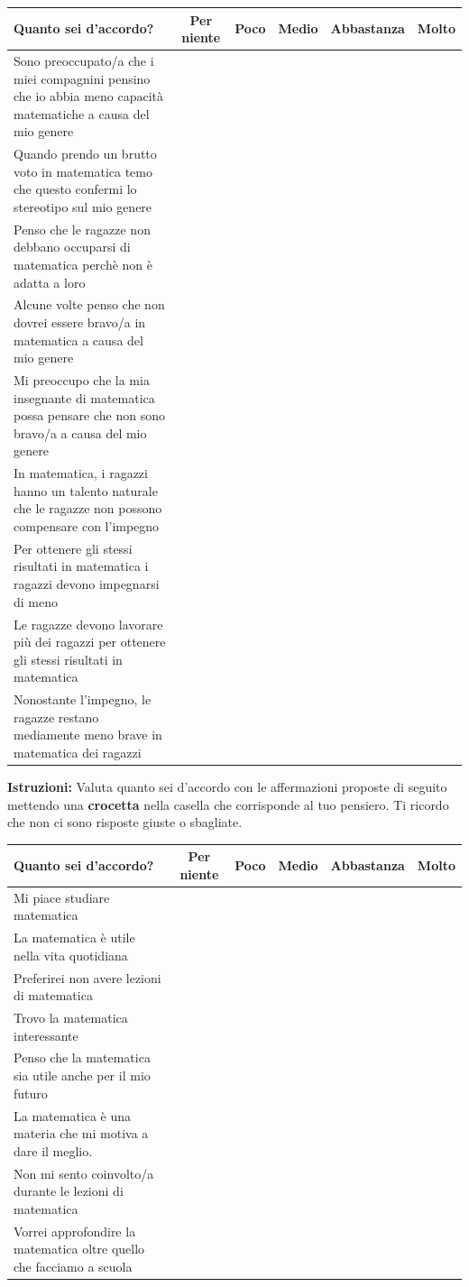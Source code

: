 \documentclass[11pt]{article}
\begin{document}
\noindent\begin{tabular}{|p{7cm}|c|c|c|c|c|}
  \hline
  \textbf{Quanto sei d'accordo?} & \textbf{Per niente} & \textbf{Poco} & \textbf{Medio} & \textbf{Abbastanza} & \textbf{Molto} \\
  \hline
  Sono preoccupato/a che i miei compagnini pensino che io abbia meno capacità matematiche a causa del mio genere & & & & & \\
  \hline
  Quando prendo un brutto voto in matematica temo che questo confermi lo stereotipo sul mio genere & & & & & \\
  \hline
  Penso che le ragazze non debbano occuparsi di matematica perchè non è adatta a loro & & & & & \\
  \hline
  Alcune volte penso che non dovrei essere bravo/a in matematica a causa del mio genere & & & & & \\
  \hline
  Mi preoccupo che la mia insegnante di matematica possa pensare che non sono bravo/a a causa del mio genere & & & & & \\
  \hline
  In matematica, i ragazzi hanno un talento naturale che le ragazze non possono compensare con l’impegno & & & & & \\
  \hline 
  Per ottenere gli stessi risultati in matematica i ragazzi devono impegnarsi di meno & & & & & \\
  \hline
  Le ragazze devono lavorare più dei ragazzi per ottenere gli stessi risultati in matematica & & & & & \\
  \hline
  Nonostante l’impegno, le ragazze restano mediamente meno brave in matematica dei ragazzi & & & & & \\
  \hline
\end{tabular}
\newpage
\noindent\textbf{Istruzioni:} Valuta quanto sei d'accordo con le affermazioni proposte di seguito mettendo una \textbf{crocetta} nella casella che corrisponde al tuo pensiero. Ti ricordo che non ci sono risposte giuste o sbagliate. 
\newline

\noindent\begin{tabular}{|p{7cm}|c|c|c|c|c|}
  \hline
  \textbf{Quanto sei d'accordo?} & \textbf{Per niente} & \textbf{Poco} & \textbf{Medio} & \textbf{Abbastanza} & \textbf{Molto} \\
  \hline
  Mi piace studiare matematica & & & & & \\
  \hline
  La matematica è utile nella vita quotidiana & & & & & \\
  \hline
  Preferirei non avere lezioni di matematica & & & & & \\
  \hline
  Trovo la matematica interessante & & & & & \\
  \hline
  Penso che la matematica sia utile anche per il mio futuro & & & & & \\
  \hline
  La matematica è una materia che mi motiva a dare il meglio. & & & & & \\
  \hline 
  Non mi sento coinvolto/a durante le lezioni di matematica & & & & & \\
  \hline
  Vorrei approfondire la matematica oltre quello che facciamo a scuola & & & & & \\
  \hline
\end{tabular}
\end{document}
